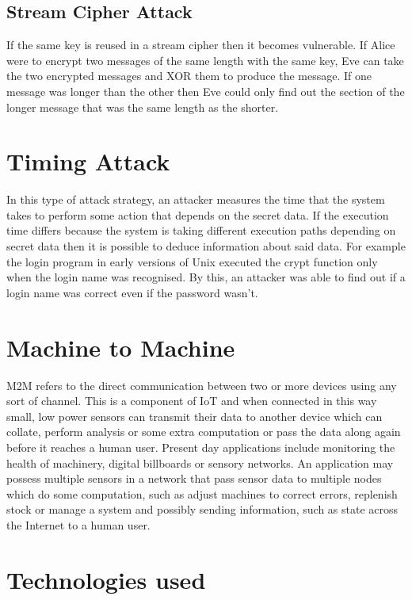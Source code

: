 \subsection{Stream Cipher Attack}
If the same key is reused in a stream cipher then it becomes vulnerable. If Alice were to encrypt two messages of the same length with the same key, Eve can take the two encrypted messages and XOR them to produce the message. If one message was longer than the other then Eve could only find out the section of the longer message that was the same length as the shorter.

\section{Timing Attack}
In this type of attack strategy, an attacker measures the time that the system takes to perform some action that depends on the secret data. If the execution time differs because the system is taking different execution paths depending on secret data then it is possible to deduce information about said data. For example the login program in early versions of Unix executed the crypt function only when the login name was recognised. By this, an attacker was able to find out if a login name was correct even if the password wasn't.

\section{Machine to Machine}

M2M refers to the direct communication between two or more devices using any sort of channel. This is a component of IoT and when connected in this way small, low power sensors can transmit their data to another device which can collate, perform analysis or some extra computation or pass the data along again before it reaches a human user. Present day applications include monitoring the health of machinery, digital billboards or sensory networks. An application may possess multiple sensors in a network that pass sensor data to multiple nodes which do some computation, such as adjust machines to correct errors, replenish stock or manage a system and possibly sending information, such as state across the Internet to a human user.

\section{Technologies used}


